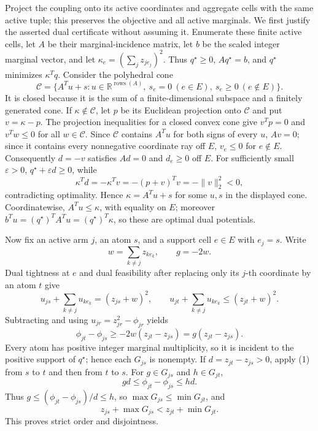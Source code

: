 Project the coupling onto its active coordinates and aggregate cells with the same active tuple; this preserves the objective and all active marginals.  We first justify the asserted dual certificate without assuming it.  Enumerate these finite active cells, let \(A\) be their marginal-incidence matrix, let \(b\) be the scaled integer marginal vector, and let \(\kappa_e=(\sum_jz_{je_j})^2\).  Thus \(q^\star\ge0\), \(Aq^\star=b\), and \(q^\star\) minimizes \(\kappa^Tq\).  Consider the polyhedral cone
\[
 \mathcal C=\{A^Tu+s:u\in\mathbb R^{\operatorname{rows}(A)},\ s_e=0\ (e\in E),\ s_e\ge0\ (e\notin E)\}.
\]
It is closed because it is the sum of a finite-dimensional subspace and a finitely generated cone.  If \(\kappa\notin\mathcal C\), let \(p\) be its Euclidean projection onto \(\mathcal C\) and put \(v=\kappa-p\).  The projection inequalities for a closed convex cone give \(v^Tp=0\) and \(v^Tw\le0\) for all \(w\in\mathcal C\).  Since \(\mathcal C\) contains \(A^Tu\) for both signs of every \(u\), \(Av=0\); since it contains every nonnegative coordinate ray off \(E\), \(v_e\le0\) for \(e\notin E\).  Consequently \(d=-v\) satisfies \(Ad=0\) and \(d_e\ge0\) off \(E\).  For sufficiently small \(\varepsilon>0\), \(q^\star+\varepsilon d\ge0\), while
\[
 \kappa^Td=-\kappa^Tv=-(p+v)^Tv=-\|v\|_2^2<0,
\]
contradicting optimality.  Hence \(\kappa=A^Tu+s\) for some \(u,s\) in the displayed cone.  Coordinatewise, \(A^Tu\le\kappa\), with equality on \(E\); moreover \(b^Tu=(q^\star)^TA^Tu=(q^\star)^T\kappa\), so these are optimal dual potentials.

Now fix an active arm \(j\), an atom \(s\), and a support cell \(e\in E\) with \(e_j=s\).  Write
\[
 w=\sum_{k\ne j}z_{ke_k},\qquad g=-2w.
\]
Dual tightness at \(e\) and dual feasibility after replacing only its \(j\)-th coordinate by an atom \(t\) give
\[
 u_{js}+\sum_{k\ne j}u_{ke_k}=(z_{js}+w)^2,
 \qquad
 u_{jt}+\sum_{k\ne j}u_{ke_k}\le(z_{jt}+w)^2.
\]
Subtracting and using \(u_{jr}=z_{jr}^2-\phi_{jr}\) yields
\[
 \phi_{jt}-\phi_{js}\ge-2w(z_{jt}-z_{js})=g(z_{jt}-z_{js}). \tag{1}
\]
Every atom has positive integer marginal multiplicity, so it is incident to the positive support of \(q^\star\); hence each \(G_{js}\) is nonempty.  If \(d=z_{jt}-z_{js}>0\), apply (1) from \(s\) to \(t\) and then from \(t\) to \(s\).  For \(g\in G_{js}\) and \(h\in G_{jt}\),
\[
 gd\le\phi_{jt}-\phi_{js}\le hd. \tag{2}
\]
Thus \(g\le(\phi_{jt}-\phi_{js})/d\le h\), so \(\max G_{js}\le\min G_{jt}\), and
\[
 z_{js}+\max G_{js}<z_{jt}+\min G_{jt}. \tag{3}
\]
This proves strict order and disjointness.

